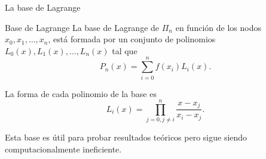 \begin{frame}{La base de Lagrange}
  \begin{exampleblock}{Base de Lagrange}
    La base de Lagrange de $\Pi_n$ en función de los nodos $x_0, x_1,
    \ldots, x_n$, está formada por un conjunto de polinomios $L_0(x),
    L_1(x), \ldots, L_n(x)$ tal que
    \[
      P_n(x)=\sum_{i=0}^{n} f(x_i) L_i(x).
    \]

    La forma de cada polinomio de la base es
    \[
      L_i(x)=\prod_{j=0, j \neq i}^{n}\frac{x-x_j}{x_i-x_j}.
    \]
  \end{exampleblock}

  Esta base es útil para \alert{probar resultados teóricos} pero sigue
  siendo \alert{computacionalmente ineficiente}.
\end{frame}
